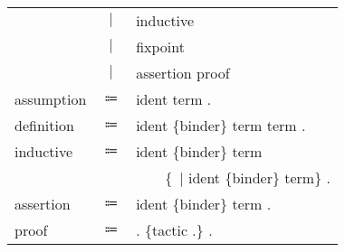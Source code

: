 \begin{table}[!htb]
\begin{tabular}{lcl}
            &$\mid$&inductive\\
            &$\mid$&fixpoint\\
            &$\mid$&assertion proof\\
        assumption
            &$\Coloneqq$&\fAxiom{} ident \scolon{} term .\\
        definition
            &$\Coloneqq$&\fDefinition{} ident \{binder\} \scolon{} term \scoloneq{} term .\\
        inductive
            &$\Coloneqq$&\fInductive{} ident \{binder\} \scolon{} term \scoloneq{}\\
            &&~~~~\{~$\mid$ ident \{binder\} \scolon{} term\} .\\
        assertion
            &$\Coloneqq$&\fTheorem{} ident \{binder\} \scolon{} term .\\
        proof
            &$\Coloneqq$&\fProof{} . \{tactic .\} \fQed{} .\\
    \end{tabular}
\end{table}
\newpage
